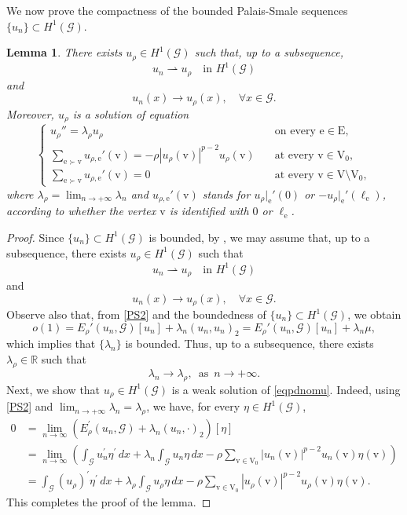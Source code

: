 \documentclass[11pt]{amsart}
\newtheorem{lemma}[theorem]{Lemma}
\newcommand{\G}{\mathcal{G}}
\newcommand{\E}{\mathrm{E}}
\newcommand{\V}{\mathrm{V}}
\newcommand{\e}{\mathrm{e}}
\newcommand{\vv}{\mathrm{v}}
\numberwithin{equation}{section}
\begin{document}
We now prove the compactness of the bounded Palais-Smale sequences $\{u_n\} \subset H^1(\mathcal{G})$.
\begin{lemma}\label{lemurhosolve}
There exists \( u_\rho \in H^1(\mathcal{G}) \) such that, up to a subsequence,
\[
u_n \rightharpoonup  u_\rho \quad \text{in } H^1(\mathcal{G})
\]
and
\[
u_n(x) \to u_\rho(x), \quad \forall x \in \G. 
\]
Moreover, $u_\rho$ is a solution of equation
\begin{equation}\label{eqpdnomu}
\begin{cases} 
u_{\rho}''=\lambda_\rho u_\rho &\quad \text{on every } \e\in \E,\\
\sum_{\e\succ\vv}u_{\rho,\e}'(\vv)=-\rho|u_{\rho}(\vv)|^{p-2}u_{\rho}(\vv)  &\quad \text{at every } \vv\in\V_0,\\
\sum_{\e\succ\vv}u_{\rho,\e}'(\vv)=0  &\quad \text{at every } \vv\in \V \setminus \V_0,
\end{cases}
\end{equation}
where $\displaystyle \lambda_\rho=\lim_{n \to +\infty} \lambda_n $ and $u_{\rho,\e}'(\vv)$ stands for $u_\rho|_\e'(0)$ or $-u_\rho|_\e'(\ell_\e)$, according to whether the vertex $\vv$ is identified with $0$ or $\ell_\e$.
\end{lemma}
\begin{proof}
Since \(\{u_n\} \subset H^1(\mathcal{G})\) is bounded, by \cite[Theorem 8.8]{Ha},  we may assume that, up to a subsequence, there exists \( u_\rho \in H^1(\mathcal{G}) \) such that
\[
u_n \rightharpoonup  u_\rho \quad \text{in } H^1(\mathcal{G})
\]
and
\[
u_n(x) \to u_\rho(x), \quad \forall x \in \G.
\]
Observe also that, from \eqref{PS2} and the boundedness of \(\{u_n\} \subset H^1(\mathcal{G})\), we obtain
$$
   o(1)= E_{\rho}'(u_n ,\G)[u_n]+\lambda_n(u_n,u_n)_2 =E_{\rho}'(u_n ,\G)[u_n]+\lambda_n \mu,
$$
which implies that $\{\lambda_n\}$ is bounded. Thus, up to a subsequence, there exists \(\lambda_\rho \in \mathbb{R}\) such that 
\[
\lambda_n \rightarrow \lambda_\rho,\,\,\,\text{as}\,\,\,n \to +\infty.
\]
Next, we show that $u_{\rho}\in H^{1}(\G)$ is a weak solution of \eqref{eqpdnomu}. Indeed, using \eqref{PS2} and  $\displaystyle \lim_{n \to +\infty} \lambda_n = \lambda_\rho$, we have, for every \(\eta\in H^{1}(\mathcal{G})\),
\begin{equation}\label{solution u}
\begin{split}
0&=\lim_{n\to\infty}\left(E^{ \prime}_{\rho}(u_{n},\mathcal{G})+\lambda_{n}(u_{n},\cdot)_2\right)[\eta]\\
&=\lim_{n\to\infty}\left(\int_{\mathcal{G}}u_{n}^{\prime}\eta^{ \prime}\,dx+\lambda_{n}\int_{\mathcal{G}}u_{n}\eta\,dx-\rho\sum_{\vv\in \V_0} |u_{n}(\vv)|^{p-2 }u_{n}(\vv)\eta(\vv)\right)\\
&=\int_{\mathcal{G}}(u_{\rho})^{\prime}\eta^{\prime}\,dx+\lambda_{\rho}\int_{\mathcal{G}}u_{\rho}\eta\,dx-\rho\sum_{\vv\in \V_0}|u_{\rho}(\vv)|^{p-2}u_{\rho}(\vv)\eta(\vv).
\end{split}
\end{equation}
This completes the proof of the lemma.
\end{proof}
\end{document}
